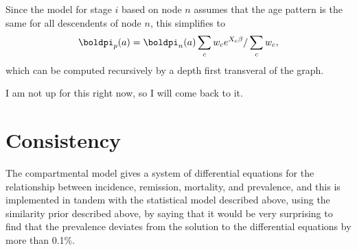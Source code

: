 Since the model for stage $i$ based on node $n$ assumes that the age pattern is the same
for all descendents of node $n$, this simplifies to
\[
\boldpi_p(a) = \boldpi_n(a) \sum_c w_c e^{X_c\beta} / \sum_c w_c,
\]
which can be computed recursively by a depth first transveral of the graph.

I am not up for this right now, so I will come back to it.

\section{Consistency}
The compartmental model gives a system of differential equations for
the relationship between incidence, remission, mortality, and
prevalence, and this is implemented in tandem with the statistical
model described above, using the similarity prior described above, by
saying that it would be very surprising to find that the prevalence
deviates from the solution to the differential equations by more than
0.1\%.


